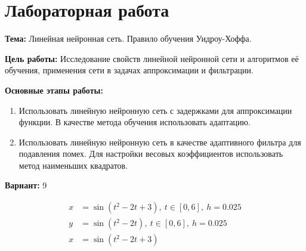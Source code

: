 \section*{Лабораторная работа }

{\bfseries Тема:} Линейная нейронная сеть. Правило обучения Уидроу-Хоффа.

{\bfseries Цель работы:} Исследование свойств линейной нейронной сети и алгоритмов её обучения, применения сети в задачах аппроксимации и фильтрации.

{\bfseries Основные этапы работы:}
\begin{enumerate}
	\item Использовать линейную нейронную сеть с задержками для аппроксимации функции. В качестве метода обучения использовать адаптацию.
	\item Использовать линейную нейронную сеть в качестве адаптивного фильтра для подавления помех. Для настройки весовых коэффициентов использовать метод наименьших квадратов.
\end{enumerate}

{\bfseries Вариант:} 9

\begin{align*}
x &= \sin(t^2 - 2t + 3),\ t \in [0, 6],\ h = 0.025 \\
y &= \sin(t^2 - 2t),\ t \in [0, 6],\ h = 0.025 \\
x &= \sin(t^2 - 2t + 3)
\end{align*}
\pagebreak
